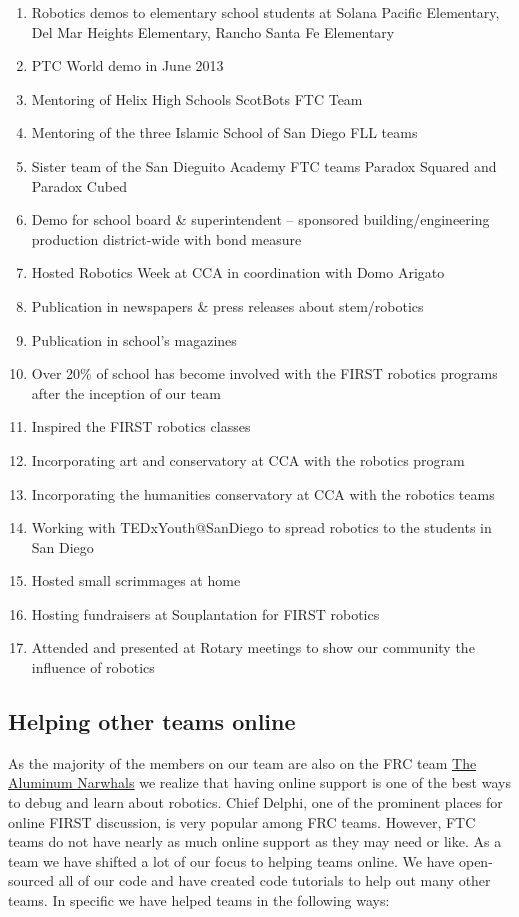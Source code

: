 \begin{enumerate}
\item Robotics demos to elementary school students at Solana Pacific Elementary, Del Mar Heights Elementary, Rancho Santa Fe Elementary
\item PTC World demo in June 2013
\item Mentoring of Helix High Schools ScotBots FTC Team
\item Mentoring of the three Islamic School of San Diego FLL teams 
\item Sister team of the San Dieguito Academy FTC teams Paradox Squared and Paradox Cubed
\item Demo for school board \& superintendent – sponsored building/engineering production district-wide with bond measure
\item Hosted Robotics Week at CCA in coordination with Domo Arigato
\item Publication in newspapers \& press releases about stem/robotics
\item Publication in school's magazines
\item Over 20\% of school has become involved with the FIRST robotics programs after the inception of our team
\item Inspired the FIRST robotics classes
\item Incorporating art and conservatory at CCA with the robotics program
\item Incorporating the humanities conservatory at CCA with the robotics teams
\item Working with TEDxYouth@SanDiego to spread robotics to the students in San Diego
\item Hosted small scrimmages at home
\item Hosting fundraisers at Souplantation for FIRST robotics
\item Attended and presented at Rotary meetings to show our community the influence of robotics
\end{enumerate}

\subsection{Helping other teams online}
As the majority of the members on our team are also on the FRC team \underline{The Aluminum Narwhals} we realize that having online support is one of the best ways to debug and learn about robotics. Chief Delphi, one of the prominent places for online FIRST discussion, is very popular among FRC teams. However, FTC teams do not have nearly as much online support as they may need or like. As a team we have shifted a lot of our focus to helping teams online. We have open-sourced all of our code and have created code tutorials to help out many other teams. In specific we have helped teams in the following ways:

